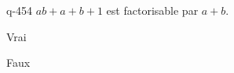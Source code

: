 \begin{truefalse}{q-454}
$ab+a+b+1$ est factorisable par $a+b$.
\item Vrai
\item* Faux
\end{truefalse}

